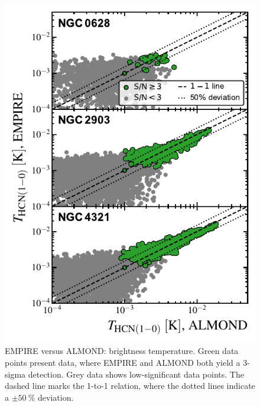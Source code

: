 \documentclass[letter, longauth]{aa} %
\begin{document}
\begin{appendix}
\begin{figure}
\centering
\includegraphics[width=\columnwidth]{Figures/ALMOND_vs_EMPIRE_brightness_temperatures_compressed_v2.pdf}
\caption{EMPIRE versus ALMOND: \hcnone brightness temperature.
Green data points present data, where EMPIRE and ALMOND both yield a 3-sigma detection.
Grey data shows low-significant data points.
The dashed line marks the 1-to-1 relation, where the dotted lines indicate a $\pm\SI{50}{\percent}$ deviation.
}
\label{fig:empire_vs_almond_brightness_temp}
\end{figure}


\end{appendix}
\end{document}
